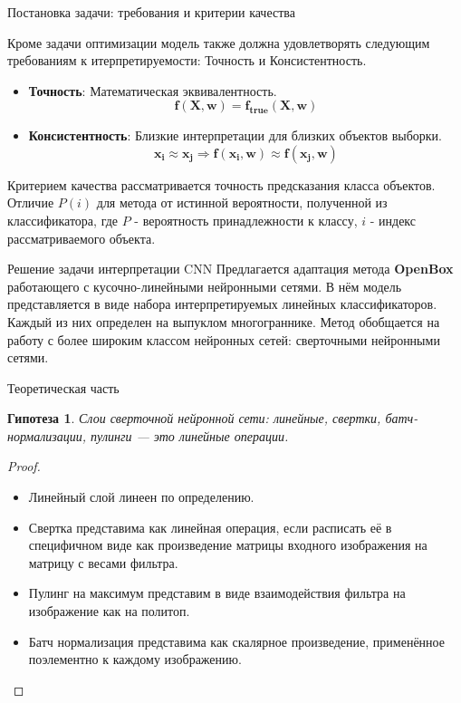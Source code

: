 \documentclass{beamer}
\begin{document}
\begin{frame}{Постановка задачи: требования и критерии качества}

Кроме задачи оптимизации модель также должна удовлетворять следующим требованиям к итерпретируемости: $\textbf{Точность}$ и $\textbf{Консистентность}$.
\begin{itemize}
    \item \textbf{Точность}:
    Математическая эквивалентность.
    $$\mathbf{f}(\mathbf{X}, \mathbf{w}) = \mathbf{f_{true}}(\mathbf{X}, \mathbf{w})$$
    \item \textbf{Консистентность}:
    Близкие интерпретации для близких объектов выборки. $$\mathbf{x_i} \approx \mathbf{x_j} \Longrightarrow \mathbf{f}(\mathbf{x_i}, \mathbf{w}) \approx \mathbf{f}(\mathbf{x_j}, \mathbf{w})$$
\end{itemize}
Критерием качества рассматривается точность предсказания класса объектов. Отличие $P(i)$ для метода от истинной вероятности, полученной из классификатора, где $P$ - вероятность принадлежности к классу, $i$ - индекс рассматриваемого объекта.
\end{frame}
\begin{frame}{Решение задачи интерпретации CNN}
Предлагается адаптация метода \textbf{OpenBox} работающего с  кусочно-линейными нейронными сетями. В нём модель представляется в виде набора интерпретируемых линейных классификаторов. Каждый из них определен на выпуклом многограннике. Метод обобщается на работу с более широким классом нейронных сетей: сверточными нейронными сетями.
\end{frame}
\begin{frame}{Теоретическая часть}
\newtheorem{hypothesis}{Гипотеза}
\begin{hypothesis}
Слои сверточной нейронной сети: линейные, свертки, батч-нормализации, пулинги --- это линейные операции.
\end{hypothesis}

\begin{proof}
\begin{itemize}
    \item Линейный слой линеен по определению. 
    \item Свертка представима как линейная операция, если расписать её в специфичном виде как произведение матрицы входного изображения на матрицу с весами фильтра.
    \item Пулинг на максимум представим в виде взаимодействия фильтра на изображение как на политоп.
    \item Батч нормализация представима как скалярное произведение, применённое поэлементно к каждому изображению.
\end{itemize}
\end{proof}
\end{frame}
\end{document}
